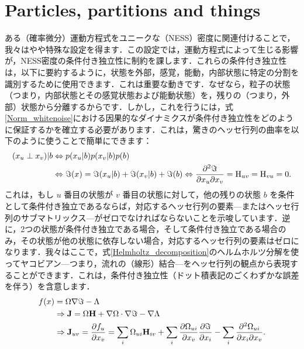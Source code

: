 \documentclass[a4paper, titlepage]{jsarticle}
\begin{document}
\section{Particles, partitions and things}
ある（確率微分）運動方程式をユニークな（NESS）密度に関連付けることで，我々はやや特殊な設定を得ます．この設定では，運動方程式によって生じる影響が，NESS密度の条件付き独立性に制約を課します．これらの条件付き独立性は，以下に要約するように，状態を外部，感覚，能動，内部状態に特定の分割を識別するために使用できます．これは重要な動きです．なぜなら，粒子の状態（つまり，内部状態とその感覚状態および能動状態）を，残りの（つまり，外部）状態から分離するからです．しかし，これを行うには，式\eqref{Norm_whitenoise}における因果的なダイナミクスが条件付き独立性をどのように保証するかを確立する必要があります．これは，驚きのヘッセ行列の曲率を以下のように使うことで簡単にできます：
\begin{equation}\label{Surprise_Hessian}
    \begin{aligned}
        (x_u\perp x_v)|b&\Leftrightarrow p\qty(x_u|b)p\qty(x_v|b)p\qty(b) \\
        &\Leftrightarrow\imaginary\qty(x)=\imaginary\qty(x_u|b)+\imaginary\qty(x_v|b)+\imaginary\qty(b)\Leftrightarrow\frac{\partial^2\imaginary}{\partial x_u\partial x_v}=\mathrm{H}_{uv}=\mathrm{H}_{vu}=0.
    \end{aligned}
\end{equation}
これは，もし $u$ 番目の状態が $v$ 番目の状態に対して，他の残りの状態 $b$ を条件として条件付き独立であるならば，対応するヘッセ行列の要素—またはヘッセ行列のサブマトリックス—がゼロでなければならないことを示唆しています．逆に，2つの状態が条件付き独立である場合，そして条件付き独立である場合のみ，その状態が他の状態に依存しない場合，対応するヘッセ行列の要素はゼロになります．我々はここで，式\eqref{Helmholtz_decomposition}のヘルムホルツ分解を使ってヤコビアン—つまり，流れの（線形）結合—をヘッセ行列の観点から表現することができます．これは，条件付き独立性（ドット積表記のごくわずかな誤差を伴う）を含意します．
\begin{equation}\label{flow_Hessian}
    \begin{aligned}
        f(x) &= \Omega\nabla\imaginary-\Lambda \\
        &\Rightarrow \mathbf{J} = \Omega\mathbf{H} + \nabla\Omega \cdot \nabla\imaginary - \nabla\Lambda \\
        &\Rightarrow \mathbf{J}_{uv} = \frac{\partial f_u}{\partial x_v} = \sum_i \Omega_{ui} \mathbf{H}_{iv} + \sum_i \frac{\partial \Omega_{ui}}{\partial x_v}\frac{\partial\imaginary}{\partial x_i} - \sum_i \frac{\partial^2 \Omega_{ui}}{\partial x_i \partial x_v}.
    \end{aligned}
\end{equation}
\end{document}
